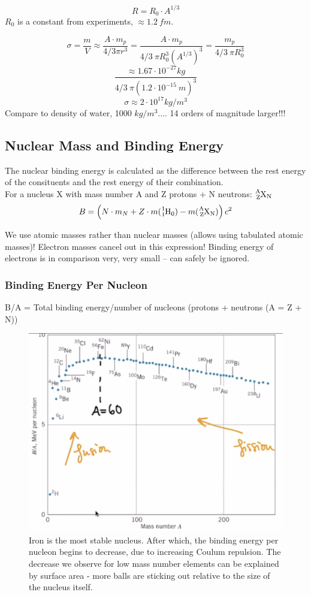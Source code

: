 \documentclass[class=article,crop=false]{standalone}
\begin{document}
\begin{result}
	$$ R = R_0 \cdot A^{1/3} $$
	$R_0$ is a constant from experiments, $\approx 1.2\ fm$.
\end{result}

\begin{question}
	$$ \sigma = \frac{m}{V} \approx \frac{A \cdot m_p}{4/3 \pi r^3} = \frac{A \cdot m_p}{4/3\ \pi R^3_0(A^{1/3})^3} = \frac{m_p}{4/3\ \pi R_0^3} $$
	$$ \frac{\approx 1.67 \cdot 10^{-27} kg}{4/3\ \pi (1.2 \cdot 10^{-15}\ m)^3} $$
	$$ \sigma \approx 2 \cdot 10^{17} kg/m^3 $$
	Compare to density of water, 1000 $kg/m^3$.... 14 orders of magnitude larger!!!
\end{question}

\subsection{Nuclear Mass and Binding Energy}
The nuclear binding energy is calculated as the difference between the rest energy of the consituents and the rest energy of their combination. \\

For a nucleus X with mass number A and Z protons + N neutrons: $\ce{^A_ZX_N}$
$$ B = \left( N \cdot m_N + Z \cdot m(\ce{^1_1H_0}) - m(\ce{^A_ZX_N})\right) c^2 $$

We use atomic masses rather than nuclear masses (allows using tabulated atomic masses)! Electron masses cancel out in this expression! Binding energy of electrons is in comparison very, very small -- can safely be ignored.

\newpage
\subsubsection{Binding Energy Per Nucleon}
B/A = Total binding energy/number of nucleons (protons + neutrons (A = Z + N))

\begin{figure}[h!]
	\centering
	\includegraphics[width=.6\linewidth]{./Images/binding_per_nucleon.png}
	\caption{Iron is the most stable nucleus. After which, the binding energy per nucleon begins to decrease, due to increasing Coulum repulsion. The decrease we observe for low mass number elements can be explained by surface area - more balls are sticking out relative to the size of the nucleus itself.}
\end{figure}
\end{document}
